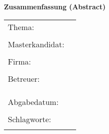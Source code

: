 
\begin{center}
{\Large \textbf{Zusammenfassung (Abstract)}}
\end{center}

\bigskip

\begin{center}
	\begin{tabular}{p{2.8cm}p{10cm}}
		Thema: & \thema \\
		 & \\
		Masterkandidat: & \autor \\
		 & \\
		Firma: & \firma \\
		 & \\
		Betreuer: & \prueferA  \\[.5ex]
		 &  \prueferB \\
		 &  \prueferC \\
		 & \\
		Abgabedatum: & \abgabedatum \\
		 & \\
		Schlagworte: & \schlagworte \\
		 & \\
	\end{tabular}
\end{center}

\bigskip

\noindent
\zusammenfassung
